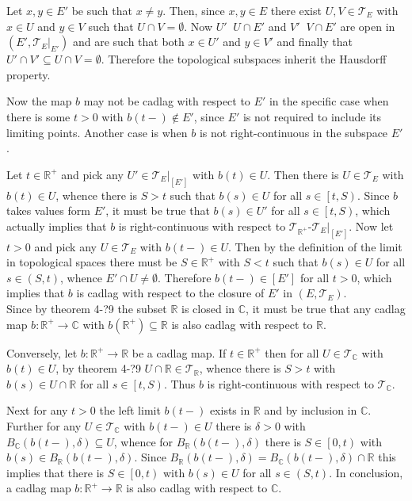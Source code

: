 \documentclass[a4paper]{article}
\newcommand{\clo}[1]{\left [ #1 \right ]}
\newcommand{\clop}[1]{\left [ #1 \right )}
\newcommand{\brac}[1]{\left ( #1 \right )}
\newcommand{\induc}[1]{\left . #1 \right \vert}
\newcommand{\Real}{\mathbb{R}}
\newcommand{\Cplx}{\mathbb{C}}
\newcommand{\Tcal}{\mathcal{T}}
\newcommand{\defn}{\mathop{\overset{\Delta}{=}}\nolimits}
\begin{document}
Let $x,y\in E'$ be such that $x\neq y$. Then, since $x,y\in E$ there exist $U,V\in \Tcal_E$ with $x\in U$ and $y\in V$ such that $U\cap V=\emptyset$. Now $U'\defn U\cap E'$ and $V'\defn V\cap E'$ are open in $\brac{E', \induc{\Tcal_E}_{E'}}$ and are such that both $x\in U'$ and $y\in V'$ and finally that $U'\cap V'\subseteq U\cap V = \emptyset$. Therefore the topological subspaces inherit the Hausdorff property.

Now the map $b$ may not be cadlag with respect to $E'$ in the specific case when there is some $t>0$ with $b\brac{t-}\notin E'$, since $E'$ is not required to include its limiting points. Another case is when $b$ is not right-continuous in the subspace $E'$.

Let $t\in \Real^+$ and pick any $U'\in \induc{\Tcal_E}_{\clo{E'}}$ with $b\brac{t}\in U$. Then there is $U\in \Tcal_E$ with $b\brac{t}\in U$, whence there is $S>t$ such that $b\brac{s}\in U$ for all $s\in \clop{t,S}$. Since $b$ takes values form $E'$, it must be true that $b\brac{s}\in U'$ for all $s\in \clop{t,S}$, which actually implies that $b$ is right-continuous with respect to $\Tcal_{\Real^+}$-$\induc{\Tcal_E}_{\clo{E'}}$. Now let $t>0$ and pick any $U\in \Tcal_E$ with $b\brac{t-}\in U$. Then by the definition of the limit in topological spaces there must be $S\in \Real^+$ with $S<t$ such that $b\brac{s}\in U$ for all $s\in \brac{S,t}$, whence $E'\cap U\neq \emptyset$. Therefore $b\brac{t-}\in \clo{E'}$ for all $t>0$, which implies that $b$ is cadlag with respect to the closure of $E'$ in $\brac{E,\Tcal_E}$.\\

Since by theorem 4-?9 the subset $\Real$ is closed in $\Cplx$, it must be true that any cadlag map $b:\Real^+\to \Cplx$ with $b\brac{\Real^+}\subseteq \Real$ is also cadlag with respect to $\Real$.

Conversely, let $b:\Real^+\to \Real$ be a cadlag map. If $t\in \Real^+$ then for all $U\in \Tcal_\Cplx$ with $b\brac{t}\in U$, by theorem 4-?9 $U\cap \Real\in \Tcal_\Real$, whence there is $S>t$ with $b\brac{s}\in U\cap \Real$ for all $s\in \clop{t,S}$. Thus $b$ is right-continuous with respect to $\Tcal_\Cplx$.

Next for any $t>0$ the left limit $b\brac{t-}$ exists in $\Real$ and by inclusion in $\Cplx$. Further for any $U\in\Tcal_\Cplx$ with $b\brac{t-}\in U$ there is $\delta>0$ with $B_\Cplx\brac{b\brac{t-},\delta}\subseteq U$, whence for $B_\Real\brac{b\brac{t-}, \delta}$ there is $S\in \clop{0,t}$ with $b\brac{s}\in B_\Real\brac{b\brac{t-}, \delta}$. Since $B_\Real\brac{b\brac{t-}, \delta}=B_\Cplx\brac{b\brac{t-},\delta}\cap \Real$ this implies that there is $S\in \clop{0,t}$ with $b\brac{s}\in U$ for all $s\in \brac{S,t}$. In conclusion, a cadlag map $b:\Real^+\to\Real$ is also cadlag with respect to $\Cplx$.
\end{document}

